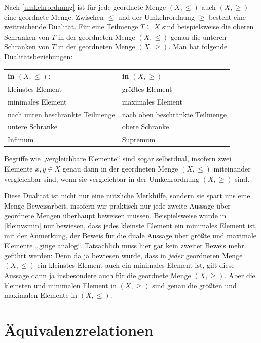 \begin{bem}
    Nach \cref{umkehrordnung} ist für jede geordnete Menge $(X,\le)$ auch $(X,\ge)$ eine geordnete Menge. Zwischen $\le$ und der Umkehrordnung $\ge$ besteht eine weitreichende Dualität. Für eine Teilmenge $T\subseteq X$ sind beispielsweise die oberen Schranken von $T$ in der geordneten Menge $(X,\le)$ genau die unteren Schranken von $T$ in der geordneten Menge $(X,\ge)$. Man hat folgende Dualitätsbeziehungen:
    \begin{longtable}{ll}
        in $(X,\le)$: & in $(X,\ge)$ \\
        \midrule
        kleinstes Element & größtes Element \\
        minimales Element & maximales Element \\
        nach unten beschränkte Teilmenge & nach oben beschränkte Teilmenge \\
        untere Schranke & obere Schranke \\
        Infimum & Supremum
    \end{longtable}
    Begriffe wie „vergleichbare Elemente“ sind sogar selbstdual, insofern zwei Elemente $x,y\in X$ genau dann in der geordneten Menge $(X,\le)$ miteinander vergleichbar sind, wenn sie vergleichbar in der Umkehrordnung $(X,\ge)$ sind.

    Diese Dualität ist nicht nur eine nützliche Merkhilfe, sondern sie spart uns eine Menge Beweisarbeit, insofern wir praktisch nur jede zweite Aussage über geordnete Mengen überhaupt beweisen müssen. Beispielsweise wurde in \cref{kleinvsmin} nur bewiesen, dass jedes kleinste Element ein minimales Element ist, mit der Anmerkung, der Beweis für die duale Aussage über größte und maximale Elemente „ginge analog“. Tatsächlich muss hier gar kein zweiter Beweis mehr geführt werden: Denn da ja bewiesen wurde, dass in \emph{jeder} geordneten Menge $(X,\le)$ ein kleinstes Element auch ein minimales Element ist, gilt diese Aussage dann ja insbesondere auch für die geordnete Menge $(X,\ge)$. Aber die kleinsten und minimalen Element in $(X,\ge)$ sind genau die größten und maximalen Elemente in $(X,\le)$.
\end{bem}





\section{Äquivalenzrelationen}


